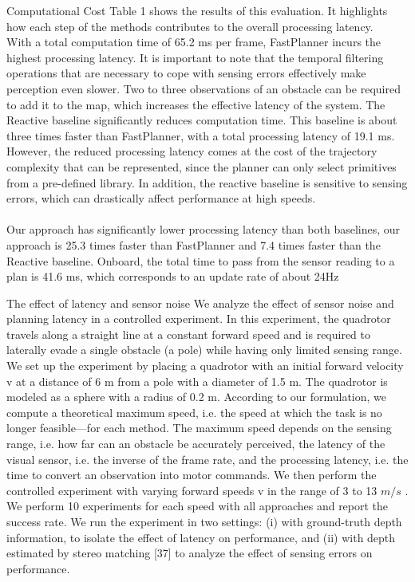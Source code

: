 \documentclass{beamer}
\begin{document}
\begin{frame}{Computational Cost}
	Table 1 shows the results of this evaluation. It highlights how each step of the methods contributes to the overall processing latency.  \\
	With a total computation time of 65.2 ms per frame, FastPlanner incurs the highest processing latency. It is important to note that the temporal filtering operations that are necessary to cope with sensing errors effectively make perception even slower. Two to three observations 	of an obstacle can be required to add it to the map, which increases the effective latency of the system. The Reactive baseline significantly reduces computation time. This baseline is about three times faster than FastPlanner, with a total processing latency of 19.1 ms. However, the reduced processing latency comes at the cost of the trajectory complexity that can be represented, since the planner can only select primitives from a pre-defined library. In addition, the reactive baseline is sensitive to sensing errors, which can drastically affect performance at high speeds. \\~\\
	Our approach has significantly lower processing latency than both baselines, our approach is 25.3 times faster than FastPlanner and 7.4 times faster than the Reactive baseline. Onboard, the total time to pass from the sensor reading to a plan is 41.6 ms, which corresponds to an update rate of about 24Hz
	
\end{frame}

\begin{frame}{The effect of latency and sensor noise}
	We analyze the effect of sensor noise and planning latency in a controlled experiment. In this experiment, the quadrotor travels along a straight line at a constant forward speed and is required to laterally evade a single obstacle (a pole) while having only limited sensing range. We set up the experiment by placing a quadrotor with an initial forward velocity v at a distance of 6 m from a pole with a diameter of 1.5 m. The quadrotor is modeled as a sphere with a radius of 0.2 m. According to our formulation, we compute a theoretical maximum speed, i.e. the speed at which the task is no longer feasible—for each method. The maximum speed depends on the sensing range, i.e. how far can an obstacle be accurately perceived, the latency of the visual sensor, i.e. the inverse of the frame rate, and the processing latency, i.e. the time to convert an observation into motor commands.  We then perform the controlled experiment with varying forward speeds v in the range of 3 to 13 $m/s$ . We perform 10 experiments for each speed with all approaches and report the success rate. We run the experiment in two settings: (i) with ground-truth depth information, to isolate the effect of latency on performance, and (ii) with depth estimated by stereo matching [37] to analyze the effect of sensing errors on performance.
\end{frame}
\end{document}

